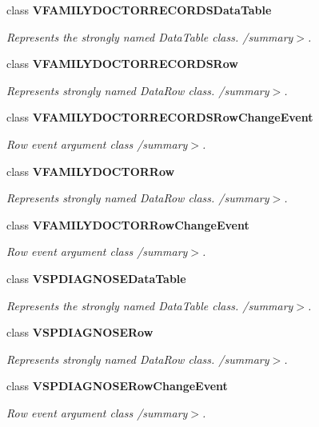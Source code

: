 \begin{CompactItemize}
class {\bf VFAMILYDOCTORRECORDSDataTable}
\begin{CompactList}\small\item\em Represents the strongly named DataTable class. /summary$>$. \item\end{CompactList}\item 
class {\bf VFAMILYDOCTORRECORDSRow}
\begin{CompactList}\small\item\em Represents strongly named DataRow class. /summary$>$. \item\end{CompactList}\item 
class {\bf VFAMILYDOCTORRECORDSRowChangeEvent}
\begin{CompactList}\small\item\em Row event argument class /summary$>$. \item\end{CompactList}\item 
class {\bf VFAMILYDOCTORRow}
\begin{CompactList}\small\item\em Represents strongly named DataRow class. /summary$>$. \item\end{CompactList}\item 
class {\bf VFAMILYDOCTORRowChangeEvent}
\begin{CompactList}\small\item\em Row event argument class /summary$>$. \item\end{CompactList}\item 
class {\bf VSPDIAGNOSEDataTable}
\begin{CompactList}\small\item\em Represents the strongly named DataTable class. /summary$>$. \item\end{CompactList}\item 
class {\bf VSPDIAGNOSERow}
\begin{CompactList}\small\item\em Represents strongly named DataRow class. /summary$>$. \item\end{CompactList}\item 
class {\bf VSPDIAGNOSERowChangeEvent}
\begin{CompactList}\small\item\em Row event argument class /summary$>$. \item\end{CompactList}\item 

\end{CompactItemize}
